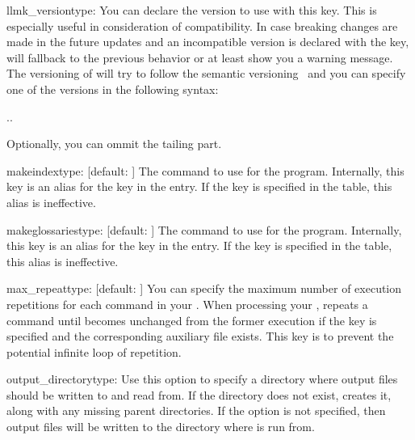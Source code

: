 \documentclass{llmk-doc}
\begin{document}
\begin{confkey}{llmk\_version}{type: }
You can declare the  version to use with this key. This is
especially useful in consideration of compatibility. In case breaking changes
are made in the future updates and an incompatible version is declared with the
key,  will fallback to the previous behavior or at least show you a
warning message. The versioning of  will try to follow the semantic
versioning~\cite{semvar} and you can specify one of the versions in the
following syntax:
%
\begin{htcode}
..
\end{htcode}
%
Optionally, you can ommit the tailing  part.
\end{confkey}

\begin{confkey}{makeindex}{type: }[default: ]
The command to use for the  program. Internally, this key
is an alias for the  key in the  entry. If
the  key is specified in the  table, this alias is
ineffective.
\end{confkey}

\begin{confkey}{makeglossaries}{type: }[default: ]
The command to use for the  program. Internally, this key
is an alias for the  key in the  entry. If
the  key is specified in the  table, this alias is
ineffective.
\end{confkey}

\begin{confkey}{max\_repeat}{type: }[default: ]
You can specify the maximum number of execution repetitions for each command in
your . When processing your ,  repeats
a command until  becomes unchanged from the former execution if
the key is specified and the corresponding auxiliary file exists. This key is to
prevent the potential infinite loop of repetition.
\end{confkey}

\begin{confkey}{output\_directory}{type: }
Use this option to specify a directory where  output files should be written to and read from. If the directory does not exist,  creates it, along with any missing parent directories. If the option is not specified, then output files will be written to the directory where  is run from.
\end{confkey}
\end{document}
